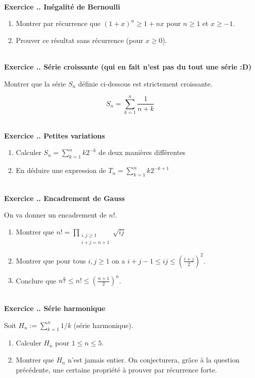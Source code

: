 \documentclass{article}
\newcounter{exo}
\newcommand{\exercice}[1][\null]{\textbf{\\ \large Exercice \thesection.\theexo. \normalsize #1} \addtocounter{exo}{1}}
\begin{document}
\exercice[Inégalité de Bernoulli]

\begin{enumerate}

\item Montrer par récurrence que $(1+x)^n \ge 1+nx$ pour $n \ge 1$ et $x \ge -1$.

\item Prouver ce résultat sans récurrence (pour $x \ge 0$).

\end{enumerate}

\exercice[Série croissante (qui en fait n'est pas du tout une série :D)]

Montrer que la série $S_n$ définie ci-dessous est strictement croissante.

\begin{equation*}
    S_n = \sum_{k = 1}^n \frac{1}{n + k}
\end{equation*}

\exercice[Petites variations]

\begin{enumerate}
    \item Calculer $S_n = \sum_{k =1}^{n} k 2^{-k}$ de deux manières 
        différentes
    \item En déduire une expression de  $T_n = \sum_{k=1}^{n} k 2^{-k+1}$
\end{enumerate}

\exercice[Encadrement de Gauss]

On va donner un encadrement de $n !$.

\begin{enumerate}

\item Montrer que $\displaystyle n! = \prod_{\substack{i,j \ge 1\\i+j = n+1}}  \sqrt{ij}$

\item Montrer que pour tous $i,j \ge 1$ on a $i+j-1 \le ij \le (\frac{i+j}{2})^2$.

\item Conclure que $n^{\frac{n}{2}} \le n ! \le (\frac{n+1}{2})^n$.

\end{enumerate}




\exercice[Série harmonique]

Soit $ H_n := \sum_{k =1}^n 1/k$ (série harmonique).

\begin{enumerate}

\item Calculer $H_n$ pour $1\le n \le 5$.

\item Montrer que $H_n$ n'est jamais entier. On conjecturera, grâce à la question précédente, une certaine propriété à prouver par récurrence forte.

\end{enumerate}
\end{document}
